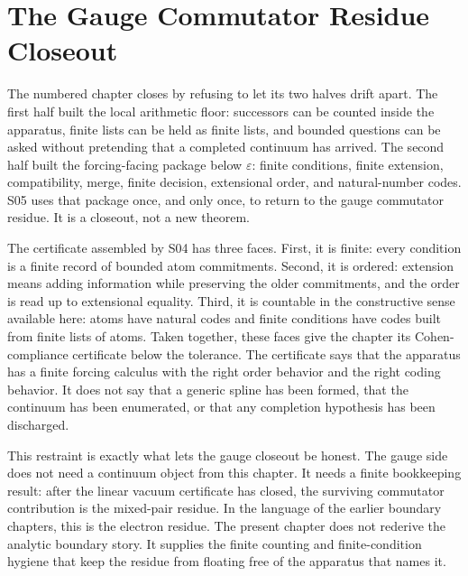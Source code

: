 \section{The Gauge Commutator Residue Closeout}

The numbered chapter closes by refusing to let its two halves drift apart. The
first half built the local arithmetic floor: successors can be counted inside
the apparatus, finite lists can be held as finite lists, and bounded questions
can be asked without pretending that a completed continuum has arrived. The
second half built the forcing-facing package below \(\varepsilon\): finite
conditions, finite extension, compatibility, merge, finite decision,
extensional order, and natural-number codes. S05 uses that package once, and
only once, to return to the gauge commutator residue. It is a closeout, not a
new theorem.

The certificate assembled by S04 has three faces. First, it is finite: every
condition is a finite record of bounded atom commitments. Second, it is ordered:
extension means adding information while preserving the older commitments, and
the order is read up to extensional equality. Third, it is countable in the
constructive sense available here: atoms have natural codes and finite
conditions have codes built from finite lists of atoms. Taken together, these
faces give the chapter its Cohen-compliance certificate below the tolerance. The
certificate says that the apparatus has a finite forcing calculus with the
right order behavior and the right coding behavior. It does not say that a
generic spline has been formed, that the continuum has been enumerated, or that
any completion hypothesis has been discharged.

This restraint is exactly what lets the gauge closeout be honest. The gauge
side does not need a continuum object from this chapter. It needs a finite
bookkeeping result: after the linear vacuum certificate has closed, the
surviving commutator contribution is the mixed-pair residue. In the language of
the earlier boundary chapters, this is the electron residue. The present chapter
does not rederive the analytic boundary story. It supplies the finite counting
and finite-condition hygiene that keep the residue from floating free of the
apparatus that names it.

